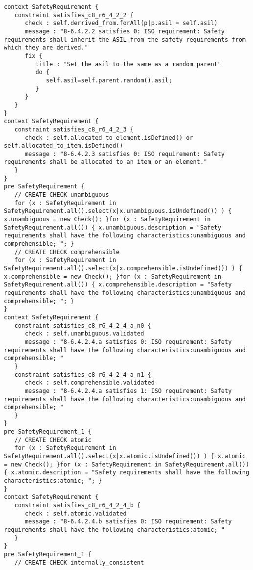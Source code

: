\documentclass[a4paper]{article}
\begin{document}
\begin{lstlisting}
context SafetyRequirement {
   constraint satisfies_c8_r6_4_2_2 {
      check : self.derrived_from.forAll(p|p.asil = self.asil)
      message : "8-6.4.2.2 satisfies 0: ISO requirement: Safety requirements shall inherit the ASIL from the safety requirements from which they are derived."
      fix {
         title : "Set the asil to the same as a random parent"
         do {
            self.asil=self.parent.random().asil;
         }
      }
   }
}
context SafetyRequirement {
   constraint satisfies_c8_r6_4_2_3 {
      check : self.allocated_to_element.isDefined() or self.allocated_to_item.isDefined()
      message : "8-6.4.2.3 satisfies 0: ISO requirement: Safety requirements shall be allocated to an item or an element."
   }
}
pre SafetyRequirement {
   // CREATE CHECK unambiguous
   for (x : SafetyRequirement in SafetyRequirement.all().select(x|x.unambiguous.isUndefined()) ) { x.unambiguous = new Check(); }for (x : SafetyRequirement in SafetyRequirement.all()) { x.unambiguous.description = "Safety requirements shall have the following characteristics:unambiguous and comprehensible; "; }
   // CREATE CHECK comprehensible
   for (x : SafetyRequirement in SafetyRequirement.all().select(x|x.comprehensible.isUndefined()) ) { x.comprehensible = new Check(); }for (x : SafetyRequirement in SafetyRequirement.all()) { x.comprehensible.description = "Safety requirements shall have the following characteristics:unambiguous and comprehensible; "; }
}
context SafetyRequirement {
   constraint satisfies_c8_r6_4_2_4_a_n0 {
      check : self.unambiguous.validated
      message : "8-6.4.2.4.a satisfies 0: ISO requirement: Safety requirements shall have the following characteristics:unambiguous and comprehensible; "
   }
   constraint satisfies_c8_r6_4_2_4_a_n1 {
      check : self.comprehensible.validated
      message : "8-6.4.2.4.a satisfies 1: ISO requirement: Safety requirements shall have the following characteristics:unambiguous and comprehensible; "
   }
}
pre SafetyRequirement_1 {
   // CREATE CHECK atomic
   for (x : SafetyRequirement in SafetyRequirement.all().select(x|x.atomic.isUndefined()) ) { x.atomic = new Check(); }for (x : SafetyRequirement in SafetyRequirement.all()) { x.atomic.description = "Safety requirements shall have the following characteristics:atomic; "; }
}
context SafetyRequirement {
   constraint satisfies_c8_r6_4_2_4_b {
      check : self.atomic.validated
      message : "8-6.4.2.4.b satisfies 0: ISO requirement: Safety requirements shall have the following characteristics:atomic; "
   }
}
pre SafetyRequirement_1 {
   // CREATE CHECK internally_consistent

\end{lstlisting}
\end{document}
